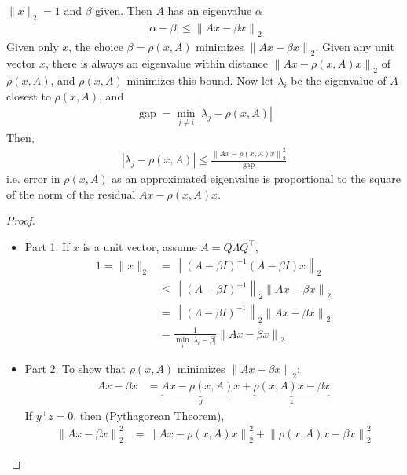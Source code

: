 \documentclass[11pt]{article}
\numberwithin{equation}{section}
\begin{document}
\begin{theorem}
    $\|x\|_{2}=1$ and $\beta$ given. Then $A$ has an eigenvalue $\alpha$ \begin{align*}
        |\alpha-\beta| \leq \left\|A{x}-\beta{x}\right\|_{2} 
    \end{align*}
    Given only $x$, the choice $\beta = \rho(x,A)$ minimizes $\left\|A{x}-\beta{x}\right\|_{2}$. Given any unit vector $x$,
    there is always an eigenvalue within distance $\left\|A{x}-\rho(x,A){x}\right\|_{2}$ of $\rho(x,A)$, and $\rho(x,A)$ minimizes this bound.
    Now let $\lambda_i$ be the eigenvalue of $A$ closest to $\rho(x,A)$, and \begin{align*}
        \operatorname{gap} = \min_{j \neq i} |\lambda_j - \rho(x,A)|
    \end{align*}
    Then, \begin{align*}
        |\lambda_j - \rho(x,A)| \leq \frac{\left\|A{x}-\rho(x,A){x}\right\|_{2}^2}{\operatorname{gap}}
    \end{align*}
    i.e. error in $\rho(x,A)$ as an approximated eigenvalue is proportional to the square of the norm of the residual $A{x}-\rho(x,A){x}$.
    \begin{proof}
        \begin{itemize}
            \item Part 1: If $x$ is a unit vector, assume $A = Q\Lambda Q^\top$, \begin{align*}
                1 = \|x\|_{2} &= \left\|(A-\beta I)^{-1}(A-\beta I) x\right\|_{2} \\
                &\leq \left\|(A-\beta I)^{-1}\right\|_{2} \left\|Ax-\beta x\right\|_{2} \\
                &= \left\|(\Lambda-\beta I)^{-1}\right\|_{2} \left\|Ax-\beta x\right\|_{2} \\
                &= \frac{1}{\min_i |\lambda_i - \beta|} \left\|Ax-\beta x\right\|_{2}
            \end{align*}
            \item Part 2: To show that $\rho(x,A)$ minimizes $\left\|A{x}-\beta{x}\right\|_{2}$: \begin{align*}
                A{x}-\beta{x} &= \underbrace{A{x}-\rho(x,A){x}}_{y} + \underbrace{\rho(x,A){x}-\beta{x}}_{z}
            \end{align*}
            If $y^\top z = 0$, then (Pythagorean Theorem), \begin{align*}
                \left\|Ax-\beta x\right\|_{2}^2 &= \left\|Ax-\rho(x,A){x}\right\|_{2}^2 + \left\|\rho(x,A){x} -\beta x\right\|_{2}^2

\end{align*}
\end{itemize}
\end{proof}
\end{theorem}
\end{document}
